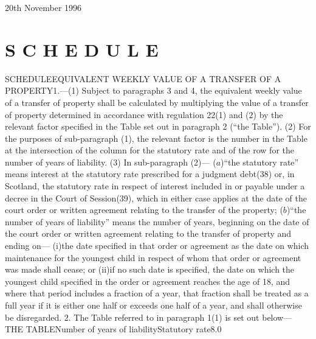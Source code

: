 \documentclass[a4paper]{article}
\newcommand{\parthead}{}
\begin{document}
20th November 1996

\clearpage

\part[Schedule]{S C H E D U L E}

\renewcommand\parthead{--- Schedule}

SCHEDULEEQUIVALENT WEEKLY VALUE OF A TRANSFER OF A PROPERTY1.—(1) Subject to
paragraphs 3 and 4, the equivalent weekly value of a transfer of property shall
be calculated by multiplying the value of a transfer of property determined in
accordance with regulation 22(1) and (2) by the relevant factor specified in the
Table set out in paragraph 2 (“the Table”).
(2) For the purposes of sub-paragraph (1), the relevant factor is the number in
the Table at the intersection of the column for the statutory rate and of the
row for the number of years of liability.
(3) In sub-paragraph (2)—
($a$)“the statutory rate” means interest at the statutory rate prescribed for a
judgment debt(38) or, in Scotland, the statutory rate in respect of interest
included in or payable under a decree in the Court of Session(39), which in
either case applies at the date of the court order or written agreement relating
to the transfer of the property;
($b$)“the number of years of liability” means the number of years, beginning on
the date of the court order or written agreement relating to the transfer of
property and ending on—
(i)the date specified in that order or agreement as the date on which
maintenance for the youngest child in respect of whom that order or agreement
was made shall cease; or
(ii)if no such date is specified, the date on which the youngest child specified
in the order or agreement reaches the age of 18,
and where that period includes a fraction of a year, that fraction shall be
treated as a full year if it is either one half or exceeds one half of a year,
and shall otherwise be disregarded.
2.  The Table referred to in paragraph 1(1) is set out below—
THE TABLENumber of years of liabilityStatutory
rate8.0%
\end{document}

